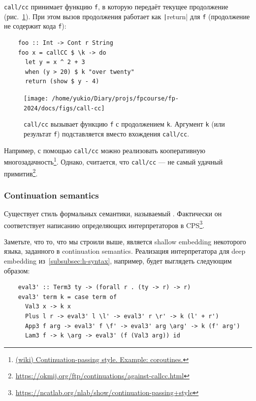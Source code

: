 \texttt{call/cc} принимает функцию \texttt{f}, в которую передаёт текущее продолжение (рис.~\ref{fig:call-cc}).
При этом вызов продолжения работает как \texttt|return| для \texttt{f} (продолжение не содержит кода \texttt{f}):
\begin{verbatim}
    foo :: Int -> Cont r String
    foo x = callCC $ \k -> do
      let y = x ^ 2 + 3
      when (y > 20) $ k "over twenty"
      return (show $ y - 4)
\end{verbatim}

\begin{figure}[h]
    \centering
    \texttt{[image: /home/yukio/Diary/projs/fpcourse/fp-2024/docs/figs/call-cc]}
    \caption{\texttt{call/cc} вызывает функцию \texttt{f} с продолжением \texttt{k}.
    Аргумент \texttt{k} (или результат \texttt{f}) подставляется вместо вхождения \texttt{call/cc}.}
    \label{fig:call-cc}
\end{figure}

Например, с помощью \texttt{call/cc} можно реализовать кооперативную многозадачность\footnote{\href{https://en.wikibooks.org/wiki/Haskell/Continuation_passing_style\#Example:_coroutines}{(wiki) Continuation-passing style.
Example: coroutines.}}.
Однако, считается, что \texttt{call/cc} --- не самый удачный примитив\footnote{\url{https://okmij.org/ftp/continuations/against-callcc.html}}.

\subsubsection{Continuation semantics}

Существует стиль формальных семантики, называемый .
Фактически он соответствует написанию определяющих интерпретаторов в CPS\footnote{\url{https://ncatlab.org/nlab/show/continuation-passing+style}}.

Заметьте, что то, что мы строили выше, является shallow embedding некоторого языка, заданного в continuation semantics.
Реализация интерпретатора для deep embedding из~\ref{subsubsec:h-syntax}, например, будет выглядеть следующим образом:
\begin{verbatim}
    eval3' :: Term3 ty -> (forall r . (ty -> r) -> r)
    eval3' term k = case term of
      Val3 x -> k x
      Plus l r -> eval3' l \l' -> eval3' r \r' -> k (l' + r')
      App3 f arg -> eval3' f \f' -> eval3' arg \arg' -> k (f' arg')
      Lam3 f -> k \arg -> eval3' (f (Val3 arg)) id
\end{verbatim}

